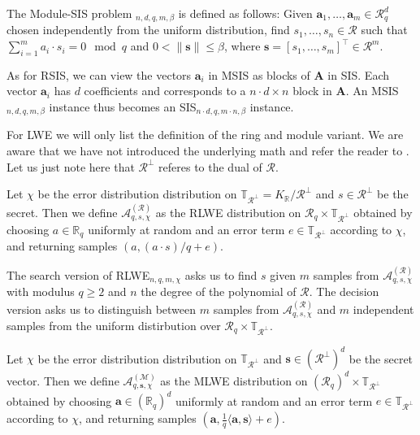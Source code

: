 \begin{definition}
    The Module-SIS problem $_{n, d, q, m, \beta}$ is defined as follows: Given  $\mathbf{a}_1, \ldots, \mathbf{a}_m \in \mathcal{R}_q^d$ chosen independently from the uniform distribution, find $s_1, \ldots, s_n \in \mathcal{R}$ such that $\sum_{i=1}^m a_i \cdot s_i = 0\mod q$ and $0 < \| \mathbf{s}\| \leq \beta$, where $\mathbf{s} = \left[s_1, \ldots, s_m\right]^\intercal \in \mathcal{R}^m$.
\end{definition} %
As for RSIS, we can view the vectors $\mathbf{a}_i$ in MSIS as blocks of $\mathbf{A}$ in SIS. Each vector $\mathbf{a}_i$ has $d$ coefficients and corresponds to a $n\cdot d \times n$ block in $\mathbf{A}$. An MSIS$_{n, d, q, m, \beta}$ instance thus becomes an SIS$_{n\cdot d, q, m \cdot n, \beta}$ instance.

For LWE we will only list the definition of the ring and module variant. We are aware that we have not introduced the underlying math and refer the reader to \cite{LS15}. Let us just note here that $\mathcal{R}^\perp$ referes to the dual of $\mathcal{R}$.
\begin{definition}
    Let $\chi$ be the error distribution distribution on $\mathbb{T}_{\mathcal{R}^\perp} = K_\mathbb{R} / \mathcal{R}^\perp$ and $s \in \mathcal{R}^\perp$ be the secret. Then we define $\mathcal{A}_{q, s, \chi}^{(\mathcal{R})}$ as the RLWE distribution on $\mathcal{R}_q \times \mathbb{T}_{\mathcal{R}^\perp}$ obtained by choosing $a \in \mathbb{R}_q$ uniformly at random and an error term $e \in \mathbb{T}_{\mathcal{R}^\perp}$ according to $\chi$, and returning samples $(a, (a \cdot s)/q + e)$.
\end{definition}

The search version of RLWE$_{n, q, m, \chi}$ asks us to find $s$ given $m$ samples from $\mathcal{A}_{q, s, \chi}^{(\mathcal{R})}$ with modulus $q\geq 2$ and $n$ the degree of the polynomial of $\mathcal{R}$. The decision version asks us to distinguish between $m$ samples from $\mathcal{A}_{q, s, \chi}^{(\mathcal{R})}$ and $m$ independent samples from the uniform distirbution over $\mathcal{R}_q \times \mathbb{T}_{\mathcal{R}^\perp}$.

\begin{definition}
    Let $\chi$ be the error distribution distribution on $\mathbb{T}_{\mathcal{R}^\perp}$ and $\mathbf{s} \in (\mathcal{R}^\perp)^d$ be the secret vector. Then we define $\mathcal{A}_{q, \mathbf{s}, \chi}^{(\mathcal{M})}$ as the MLWE distribution on $(\mathcal{R}_q)^d \times \mathbb{T}_{\mathcal{R}^\perp}$ obtained by choosing $\mathbf{a} \in (\mathbb{R}_q)^d$ uniformly at random and an error term $e \in \mathbb{T}_{\mathcal{R}^\perp}$ according to $\chi$, and returning samples $(\mathbf{a}, \frac{1}{q}\langle \mathbf{a},\mathbf{s}\rangle + e)$.
\end{definition}

